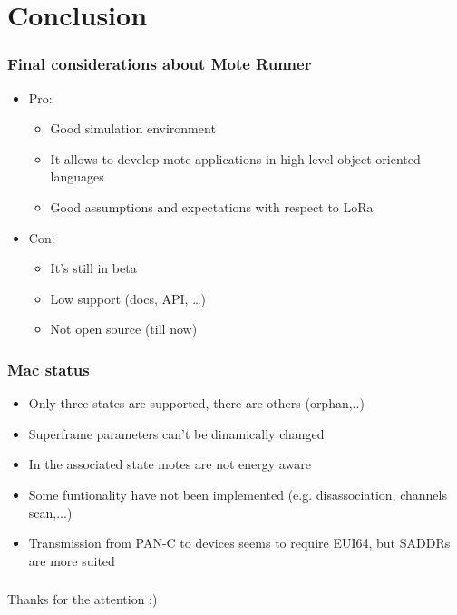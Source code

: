 \section{Conclusion} 

\begin{frame}[fragile]
  \frametitle{Final considerations about Mote Runner}
   \begin{itemize}
    \item Pro:
    \begin{itemize}
      \item Good simulation environment
      \item It allows to develop mote applications in high-level object-oriented languages
      \item Good assumptions and expectations with respect to LoRa
    \end{itemize}
    \item Con:
    \begin{itemize}
      \item It's still in beta
      \item Low support (docs, API, \dots)
      \item Not open source (till now)
    \end{itemize}
  \end{itemize}
\end{frame}

\begin{frame}[fragile]
  \frametitle{Mac status}
  \begin{itemize}
    \item Only three states are supported, there are others (orphan,..)
    \item Superframe parameters can't be dinamically changed
    \item In the associated state motes are not energy aware
    \item Some funtionality have not been implemented (e.g. disassociation, channels scan,...)
    \item Transmission from PAN-C to devices seems to require EUI64, but SADDRs are more suited
  \end{itemize}

\end{frame}


\begin{frame}[fragile]
  \frametitle{}
  \begin{center}
  	Thanks for the attention :)
  \end{center}
  
\end{frame}